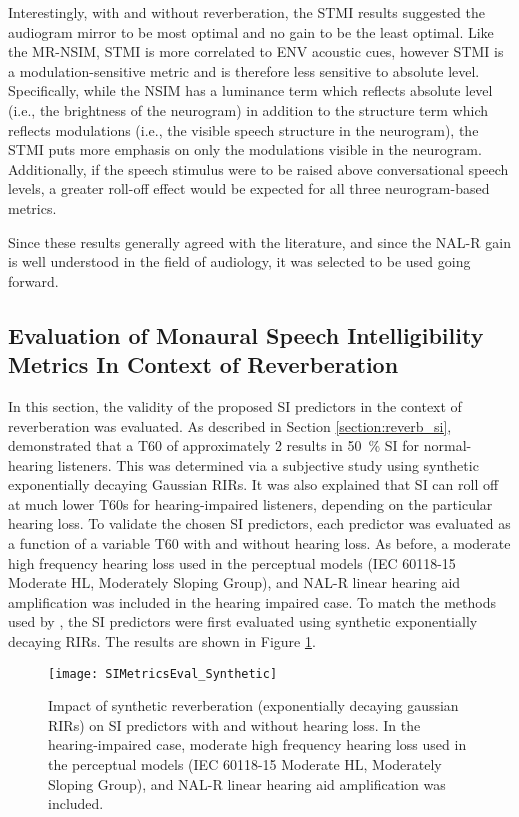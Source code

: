 Interestingly, with and without reverberation, the STMI results suggested the audiogram mirror to be most optimal and no gain to be the least optimal. Like the MR-NSIM, STMI is more correlated to ENV acoustic cues, however STMI is a modulation-sensitive metric and is therefore less sensitive to absolute level. Specifically, while the NSIM has a luminance term which reflects absolute level (i.e., the brightness of the neurogram) in addition to the structure term which reflects modulations (i.e., the visible speech structure in the neurogram), the STMI puts more emphasis on only the modulations visible in the neurogram. Additionally, if the speech stimulus were to be raised above conversational speech levels, a greater roll-off effect would be expected for all three neurogram-based metrics.

Since these results generally agreed with the literature, and since the NAL-R gain is well understood in the field of audiology, it was selected to be used going forward.


\subsection{Evaluation of Monaural Speech Intelligibility Metrics In Context of Reverberation} \label{section:eval_si_metrics}

In this section, the validity of the proposed SI predictors in the context of reverberation was evaluated. As described in Section \ref{section:reverb_si}, \cite{george2010measuring} demonstrated that a T60 of approximately \qty{2}{\sec} results in \qty{50}{\percent} SI for normal-hearing listeners. This was determined via a subjective study using synthetic exponentially decaying Gaussian RIRs. It was also explained that SI can roll off at much lower T60s for hearing-impaired listeners, depending on the particular hearing loss. To validate the chosen SI predictors, each predictor was evaluated as a function of a variable T60 with and without hearing loss. As before, a moderate high frequency hearing loss used in the perceptual models (IEC 60118-15 Moderate HL, Moderately Sloping Group), and NAL-R linear hearing aid amplification was included in the hearing impaired case. To match the methods used by \cite{george2010measuring}, the SI predictors were first evaluated using synthetic exponentially decaying RIRs. The results are shown in Figure \ref{fig:SIMetricsEval_Synthetic}.


\begin{figure}[H]
	\texttt{[image: SIMetricsEval\_Synthetic]}
	\centering
	\caption[Impact of synthetic reverberation on proposed SI predictors]{Impact of synthetic reverberation (exponentially decaying gaussian RIRs) on SI predictors with and without hearing loss. In the hearing-impaired case, moderate high frequency hearing loss used in the perceptual models (IEC 60118-15 Moderate HL, Moderately Sloping Group), and NAL-R linear hearing aid amplification was included.}
	\label{fig:SIMetricsEval_Synthetic}
\end{figure}

